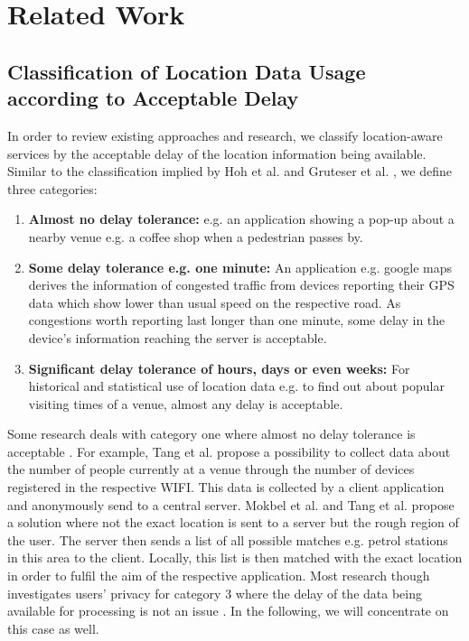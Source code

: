 \chapter{Related Work}\label{chapter:related-work}

\section{Classification of Location Data Usage according to Acceptable Delay}
In order to review existing approaches and research, we classify location-aware services by the acceptable delay of the location information being available. Similar to the classification implied by Hoh et al. \parencite{hoh2005protecting} and Gruteser et al. \parencite{gruteser2003anonymous}, we define three categories:
\begin{enumerate}
  \item \textbf{Almost no delay tolerance:} e.g. an application showing a pop-up about a nearby venue e.g. a coffee shop when a pedestrian passes by.
  \item \textbf{Some delay tolerance e.g. one minute:} An application e.g. google maps derives the information of congested traffic from devices reporting their GPS data which show lower than usual speed on the respective road. As congestions worth reporting last longer than one minute, some delay in the device's information reaching the server is acceptable.
  \item \textbf{Significant delay tolerance of hours, days or even weeks:} For historical and statistical use of location data e.g. to find out about popular visiting times of a venue, almost any delay is acceptable.
\end{enumerate}
Some research deals with category one where almost no delay tolerance is acceptable \parencite{location-privacy, mix-zones, tang2006putting}. For example, Tang et al. \parencite{tang2006putting} propose a possibility to collect data about the number of people currently at a venue through the number of devices registered in the respective WIFI. This data is collected by a client application and anonymously send to a central server. Mokbel et al. \parencite{casper} and Tang et al. \parencite{tang2006putting} propose a solution where not the exact location is sent to a server but the rough region of the user. The server then sends a list of all possible matches e.g. petrol stations in this area to the client. Locally, this list is then matched with the exact location in order to fulfil the aim of the respective application.
Most research though investigates users' privacy for category 3 where the delay of the data being available for processing is not an issue \parencite{krumm, cellphone, privacy-home-work-pairs, twitter}. In the following, we will concentrate on this case as well.

